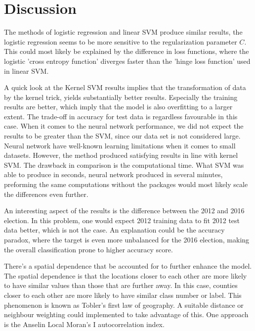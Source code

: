 \section{Discussion}
\setlength{\parindent}{0cm}
The  methods of logistic regression and linear SVM produce similar results, the logistic regression seems to be more sensitive to the regularization parameter $C$. This could most likely be explained by the difference in loss functions, where the logistic 'cross entropy function' diverges faster than the 'hinge loss function' used in linear SVM.
\\
\par
A quick look at the Kernel SVM results implies that the transformation of data by the kernel trick, yields substantially better results. Especially the training results are better, which imply that the model is also overfitting to a larger extent. The trade-off in accuracy for test data is regardless favourable in this case. When it comes to the neural network performance, we did not expect the results to be greater than the SVM, since our data set is not considered large. Neural network have well-known learning limitations when it comes to small datasets. However, the method produced satisfying results in line with kernel SVM. The drawback in comparison is the computational time. What SVM was able to produce in seconds, neural network produced in several minutes, preforming the same computations without the packages would most likely scale the differences even further.
\\
\par
An interesting aspect of the results is the difference between the 2012 and 2016 election. In this problem, one would expect 2012 training data to fit 2012 test data better, which is not the case. An explanation could be the accuracy paradox, where the target is even more unbalanced for the 2016 election, making the overall classification prone to higher accuracy score. 
\\
\par
There's a spatial dependence that be accounted for to further enhance the model. The spatial dependence is that the locations closer to each other are more likely to have similar values than those that are further away. In this case, counties closer to each other are more likely to have similar class number or label. This phenomenon is known as Tobler's first law of geography. A suitable distance or neighbour weighting could implemented to take advantage of this. One approach is the Anselin Local Moran's I autocorrelation index. 

